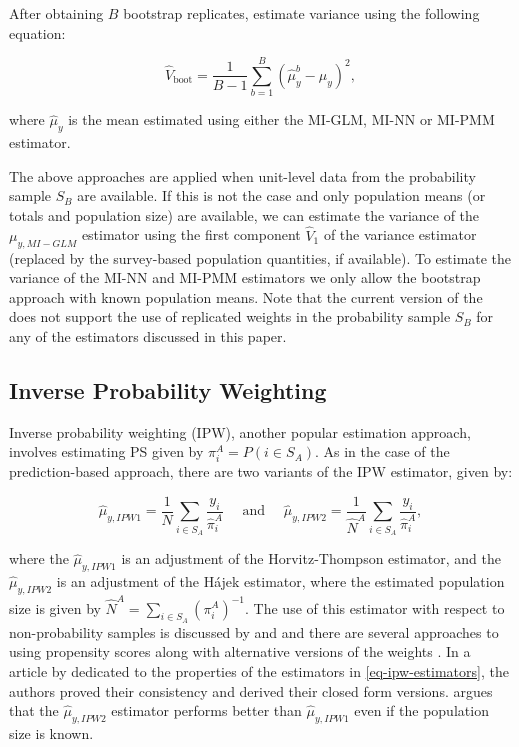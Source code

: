 \documentclass[
]{jss}
\begin{document}
After obtaining \(B\) bootstrap replicates, estimate variance using the
following equation:

\begin{equation}
\hat{V}_{\text{boot}} = \frac{1}{B-1}\sum_{b=1}^B\left(\hat{\mu}^b_y - \hat{\mu}_y\right)^2,
\label{eq-var-bootstrap}
\end{equation}

where \(\hat{\mu}_y\) is the mean estimated using either the MI-GLM,
MI-NN or MI-PMM estimator.

The above approaches are applied when unit-level data from the
probability sample \(S_B\) are available. If this is not the case and
only population means (or totals and population size) are available, we
can estimate the variance of the \(\mu_{y,MI-GLM}\) estimator using the
first component \(\hat{V}_1\) of the \citet{kim_combining_2021} variance
estimator (replaced by the survey-based population quantities, if
available). To estimate the variance of the MI-NN and MI-PMM estimators
we only allow the bootstrap approach with known population means. Note
that the current version of the  does not support the
use of replicated weights in the probability sample \(S_B\) for any of
the estimators discussed in this paper.

\subsection{Inverse Probability Weighting}\label{sec-ipw}

Inverse probability weighting (IPW), another popular estimation
approach, involves estimating PS given by
\(\pi_i^A=P\left(i \in S_A \right)\). As in the case of the
prediction-based approach, there are two variants of the IPW estimator,
given by:

\begin{equation}
  \hat{\mu}_{y,IPW1}=\frac{1}{N} \sum_{i \in S_A} \frac{y_i}{\hat{\pi}_i^A} \quad \text { and } \quad 
  \hat{\mu}_{y,IPW2}=\frac{1}{\hat{N}^A} \sum_{i \in S_A} \frac{y_i}{\hat{\pi}_i^A},
\label{eq-ipw-estimators}
\end{equation}

where the \(\hat{\mu}_{y,IPW1}\) is an adjustment of the
Horvitz-Thompson estimator, and the \(\hat{\mu}_{y,IPW2}\) is an
adjustment of the Hájek estimator, where the estimated population size
is given by \(\hat{N}^A = \sum_{i \in S_A} (\pi_i^A)^{-1}\). The use of
this estimator with respect to non-probability samples is discussed by
\citet{lee2006propensity} and
\citet[chapter 13]{biffignandi2021handbook} and there are several
approaches to using propensity scores along with alternative versions of
the weights \citep[cf.][section 3]{elliott_inference_2017}. In a article
by \citet{chen2020doubly} dedicated to the properties of the estimators
in \eqref{eq-ipw-estimators}, the authors proved their consistency and
derived their closed form versions.
\citet[section 4.2]{wu2022statistical} argues that the
\(\hat{\mu}_{y,IPW2}\) estimator performs better than
\(\hat{\mu}_{y,IPW1}\) even if the population size is known.
\end{document}
